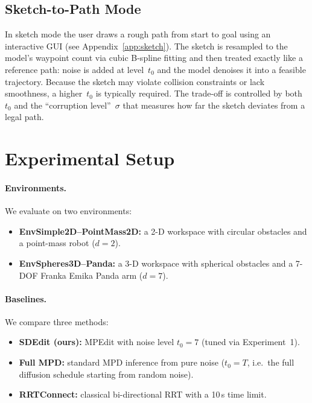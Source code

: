 \documentclass[12pt]{article}
\begin{document}
\subsection{Sketch-to-Path Mode}
\label{sec:sketch}

In sketch mode the user draws a rough path from start to goal using an
interactive GUI (see Appendix~\ref{app:sketch}).  The sketch is resampled
to the model's waypoint count via cubic B-spline fitting and then treated
exactly like a reference path: noise is added at level~$t_0$ and the
model denoises it into a feasible trajectory.  Because the sketch may
violate collision constraints or lack smoothness, a higher~$t_0$ is
typically required.  The trade-off is controlled by both~$t_0$ and the
``corruption level''~$\sigma$ that measures how far the sketch deviates
from a legal path.

\section{Experimental Setup}
\label{sec:experiments}

\paragraph{Environments.}
We evaluate on two environments:
\begin{itemize}
  \item \textbf{EnvSimple2D--PointMass2D:} a 2-D workspace with circular
        obstacles and a point-mass robot ($d{=}2$).
  \item \textbf{EnvSpheres3D--Panda:} a 3-D workspace with spherical
        obstacles and a 7-DOF Franka Emika Panda arm ($d{=}7$).
\end{itemize}

\paragraph{Baselines.}
We compare three methods:
\begin{itemize}
  \item \textbf{SDEdit (ours):} MPEdit with noise level $t_0{=}7$
        (tuned via Experiment~1).
  \item \textbf{Full MPD:} standard MPD inference from pure noise ($t_0{=}T$,
        i.e.\ the full diffusion schedule starting from random noise).
  \item \textbf{RRTConnect:} classical bi-directional RRT with a 10\,s
        time limit.
\end{itemize}
\end{document}
